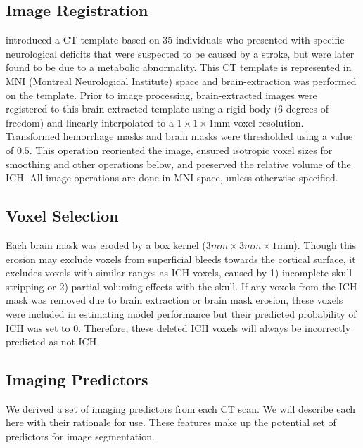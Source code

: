 \documentclass{elsarticle_nonatbib}\usepackage[]{graphicx}\usepackage[]{color}
\begin{document}
\subsection{Image Registration}
\citet{rorden_age-specific_2012} introduced a CT template based on $35$ individuals who presented with specific neurological deficits that were suspected to be caused by a stroke, but were later found to be due to a metabolic abnormality.  This CT template is represented in MNI (Montreal Neurological Institute) space and brain-extraction was performed on the template.  Prior to image processing, brain-extracted images were registered to this brain-extracted template using a rigid-body (6 degrees of freedom) and linearly interpolated to a $1\times1\times1$mm voxel resolution.  Transformed hemorrhage masks and brain masks were thresholded using a value of $0.5$. This operation reoriented the image, ensured isotropic voxel sizes for smoothing and other operations below, and preserved the relative volume of the ICH.  All image operations are done in MNI space, unless otherwise specified.


\subsection{Voxel Selection}
Each brain mask was eroded by a box kernel ($3mm\times3mm\times1$mm).  Though this erosion may exclude voxels from superficial bleeds towards the cortical surface, it excludes voxels with similar ranges as ICH voxels, caused by 1) incomplete skull stripping or 2) partial voluming effects with the skull.  If any voxels from the ICH mask was removed due to brain extraction or brain mask erosion, these voxels were included in estimating model performance but their predicted probability of ICH was set to $0$.  Therefore, these deleted ICH voxels will always be incorrectly predicted as not ICH.  




\subsection{Imaging Predictors}
We derived a set of imaging predictors from each CT scan.  We will describe each here with their rationale for use.  These features make up the potential set of predictors for image segmentation.
\end{document}
